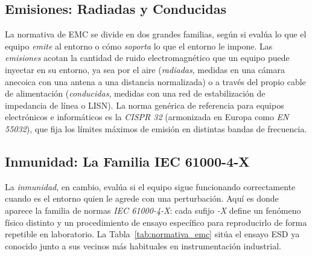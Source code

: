 \subsection{Emisiones: Radiadas y Conducidas}\label{sub:emisiones_emc}

La normativa de EMC se divide en dos grandes familias, según si evalúa lo que el equipo \emph{emite} al entorno o cómo \emph{soporta} lo que el entorno le impone. Las \emph{emisiones} acotan la cantidad de ruido electromagnético que un equipo puede inyectar en su entorno, ya sea por el aire (\emph{radiadas}, medidas en una cámara anecoica con una antena a una distancia normalizada) o a través del propio cable de alimentación (\emph{conducidas}, medidas con una red de estabilización de impedancia de línea o LISN). La norma genérica de referencia para equipos electrónicos e informáticos es la \emph{CISPR 32} (armonizada en Europa como \emph{EN 55032}), que fija los límites máximos de emisión en distintas bandas de frecuencia.

\subsection{Inmunidad: La Familia IEC 61000-4-X}\label{sub:inmunidad_emc}

La \emph{inmunidad}, en cambio, evalúa si el equipo sigue funcionando correctamente cuando es el entorno quien le agrede con una perturbación. Aquí es donde aparece la familia de normas \emph{IEC 61000-4-X}: cada sufijo \emph{-X} define un fenómeno físico distinto y un procedimiento de ensayo específico para reproducirlo de forma repetible en laboratorio. La Tabla~\ref{tab:normativa_emc} sitúa el ensayo ESD ya conocido junto a sus vecinos más habituales en instrumentación industrial.

